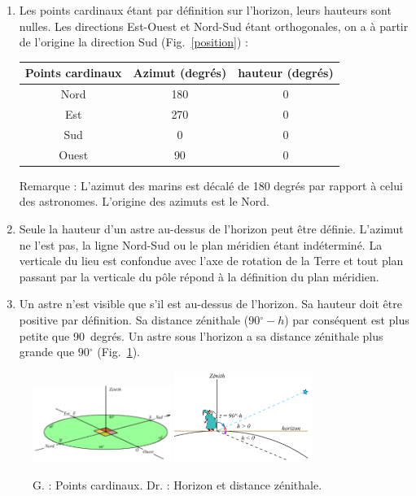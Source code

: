 \documentclass[a4paper,10pt]{report}
\renewcommand{\deg}{\ensuremath{^{\circ}}}
\begin{document}
\begin{Answer}
  \begin{enumerate}
  \item Les points cardinaux étant par définition sur l'horizon, leurs
    hauteurs sont nulles. Les directions Est-Ouest et Nord-Sud étant
    orthogonales, on a à partir de l'origine la direction Sud
    (Fig.~\ref{position}) :
    \begin{center}
      \begin{tabular}{|c|c|c|}
        \hline
        Points cardinaux & Azimut (degrés) & hauteur (degrés) \\ \hline
        Nord  & 180 & 0 \\ \hline
        Est   & 270 & 0 \\ \hline
        Sud   & 0   & 0 \\ \hline
        Ouest & 90  & 0 \\ \hline
      \end{tabular}
    \end{center}
    Remarque : L'azimut des marins est décalé de 180 degrés par rapport
    à celui des astronomes. L'origine des azimuts est le Nord.

  \item Seule la hauteur d'un astre au-dessus de l'horizon peut être
    définie. L'azimut ne l'est pas, la ligne Nord-Sud ou le plan
    méridien étant indéterminé. La verticale du lieu est confondue
    avec l'axe de rotation de la Terre et tout plan passant par la
    verticale du pôle répond à la définition du plan méridien.

  \item Un astre n'est visible que s'il est au-dessus de l'horizon. Sa
    hauteur doit être positive par définition. Sa distance zénithale
    ($90\deg - h$) par conséquent est plus petite que 90~degrés.  Un
    astre sous l'horizon a sa distance zénithale plus grande que
    $90\deg$ (Fig.~\ref{position2}).
  \end{enumerate}

  \begin{figure}[htp]
    \begin{center}
      \includegraphics[width=0.4\textwidth]{position}
      \includegraphics[width=0.4\textwidth]{position2}
    \end{center}
    \label{position}
    \label{position2}
    \caption{G. : Points cardinaux. Dr. : Horizon et distance zénithale.}
  \end{figure}
\end{Answer}
\end{document}

